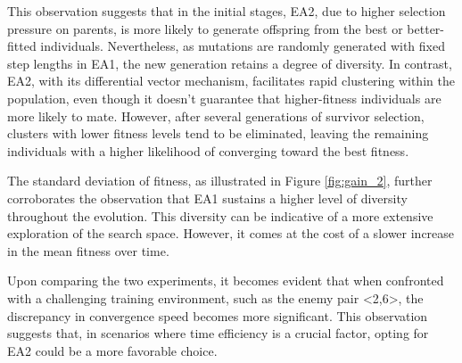 This observation suggests that in the initial stages, EA2, due to higher selection pressure on parents, is more likely to generate offspring from the best or better-fitted individuals. Nevertheless, as mutations are randomly generated with fixed step lengths in EA1, the new generation retains a degree of diversity. In contrast, EA2, with its differential vector mechanism, facilitates rapid clustering within the population, even though it doesn't guarantee that higher-fitness individuals are more likely to mate. However, after several generations of survivor selection, clusters with lower fitness levels tend to be eliminated, leaving the remaining individuals with a higher likelihood of converging toward the best fitness.

The standard deviation of fitness, as illustrated in Figure \ref{fig:gain_2}, further corroborates the observation that EA1 sustains a higher level of diversity throughout the evolution. This diversity can be indicative of a more extensive exploration of the search space. However, it comes at the cost of a slower increase in the mean fitness over time.

Upon comparing the two experiments, it becomes evident that when confronted with a challenging training environment, such as the enemy pair <2,6>, the discrepancy in convergence speed becomes more significant. This observation suggests that, in scenarios where time efficiency is a crucial factor, opting for EA2 could be a more favorable choice.



